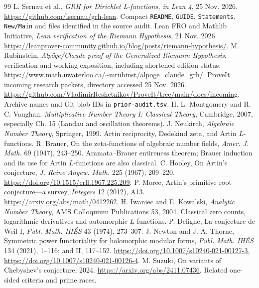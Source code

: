 \documentclass[11pt]{article}
\theoremstyle{definition}\newtheorem{definition}[theorem]{Definition}
\begin{document}
\begin{thebibliography}{99}\small
{} L. Sernau et al., \emph{GRH for Dirichlet L-functions, in Lean 4}, 25 Nov. 2026. \url{https://github.com/lsernau/grh-lean}. Compact \texttt{README}, \texttt{GUIDE}, \texttt{Statements}, \texttt{New/Main} and files identified in the source audit.
 Lean FRO and Mathlib Initiative, \emph{Lean verification of the Riemann Hypothesis}, 21 Nov. 2026. \url{https://leanprover-community.github.io/blog/posts/riemann-hypothesis/}.
 M. Rubinstein, \emph{Alp\"oge/Claude proof of the Generalized Riemann Hypothesis}, verification and working exposition, including shortened edition status. \url{https://www.math.uwaterloo.ca/~mrubinst/alpoge_claude_grh/}.
 ProveIt incoming research packets, directory accessed 25 Nov. 2026. \url{https://github.com/VladimirReshetnikov/ProveIt/tree/main/docs/incoming}. Archive names and Git blob IDs in \texttt{prior-audit.tsv}.
 H. L. Montgomery and R. C. Vaughan, \emph{Multiplicative Number Theory I: Classical Theory}, Cambridge, 2007, especially Ch. 15 (Landau and oscillation theorems).
 J. Neukirch, \emph{Algebraic Number Theory}, Springer, 1999. Artin reciprocity, Dedekind zeta, and Artin $L$-functions.
 R. Brauer, On the zeta-functions of algebraic number fields, \emph{Amer. J. Math.} 69 (1947), 243--250. Aramata--Brauer entireness theorem; Brauer induction and its use for Artin $L$-functions are also classical.
 C. Hooley, On Artin's conjecture, \emph{J. Reine Angew. Math.} 225 (1967), 209--220. \url{https://doi.org/10.1515/crll.1967.225.209}.
 P. Moree, Artin's primitive root conjecture---a survey, \emph{Integers} 12 (2012), A13. \url{https://arxiv.org/abs/math/0412262}.
 H. Iwaniec and E. Kowalski, \emph{Analytic Number Theory}, AMS Colloquium Publications 53, 2004. Classical zero counts, logarithmic derivatives and automorphic $L$-functions.
 P. Deligne, La conjecture de Weil I, \emph{Publ. Math. IH\'ES} 43 (1974), 273--307.
 J. Newton and J. A. Thorne, Symmetric power functoriality for holomorphic modular forms, \emph{Publ. Math. IH\'ES} 134 (2021), 1--116; and II, 117--152. \url{https://doi.org/10.1007/s10240-021-00127-3}, \url{https://doi.org/10.1007/s10240-021-00126-4}.
 M. Suzuki, On variants of Chebyshev's conjecture, 2024. \url{https://arxiv.org/abs/2411.07436}. Related one-sided criteria and prime races.
\end{thebibliography}
\end{document}
